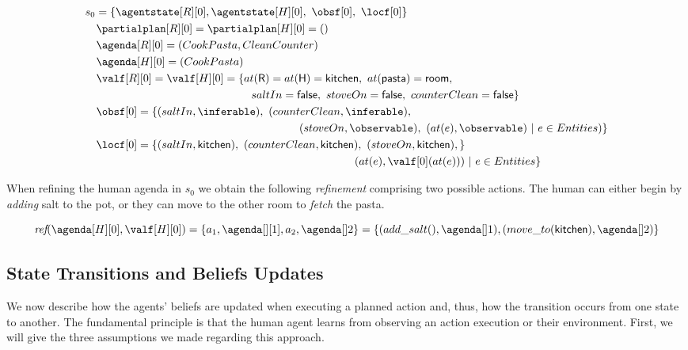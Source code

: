 {\small
\noindent
\begin{align*}
&s_0 = \{\agentstate[R][0], \agentstate[H][0],~\obsf[0],~\locf[0]\} \\
&\quad \partialplan[R][0] = \partialplan[H][0] = ()\\
&\quad \agenda[R][0] = (CookPasta, CleanCounter)\\
&\quad \agenda[H][0] = (CookPasta)\\
&\quad \valf[R][0] = \valf[H][0] = \{at(\textsf{R}) = at(\textsf{H}) = \textsf{kitchen},~at(\textsf{pasta})=\textsf{room},\\
&\qquad \qquad \qquad \qquad \qquad \qquad \qquad \quad saltIn = \textsf{false},~stoveOn = \textsf{false},~counterClean = \textsf{false}\}\\
&\quad \obsf[0] = \{ (saltIn,\inferable),~(counterClean,\inferable),\\
&\qquad \qquad \qquad \qquad \qquad \qquad \qquad \qquad \qquad \quad \ (stoveOn,\observable),~(at(e),\observable) ~|~ e \in Entities)\}\\
&\quad \locf[0] = \{ (saltIn,\textsf{kitchen}),~(counterClean,\textsf{kitchen}),~(stoveOn,\textsf{kitchen}), \}\\
&\qquad \qquad \qquad \qquad \qquad \qquad \qquad \qquad \qquad \qquad \qquad \qquad \ (at(e),\valf[0](at(e))) ~|~ e \in Entities \}
\end{align*}

When refining the human agenda in $s_0$ we obtain the following \textit{refinement} comprising two possible actions. The human can either begin by \textit{adding} salt to the pot, or they can move to the other room to \textit{fetch} the pasta. 

{\small
\begin{equation*}
    \textit{ref}(\agenda[H][0], \valf[H][0]) = \{ a_1,\agenda[][1], a_2,\agenda[]2 \}= \{ (add\_salt(),\agenda[]1), (move\_to(\textsf{kitchen}),\agenda[]2) \}
\end{equation*}
}

    \subsection{State Transitions and Beliefs Updates}

We now describe how the agents' beliefs are updated when executing a planned action and, thus, how the transition occurs from one state to another. The fundamental principle is that the human agent learns from observing an action execution or their environment. First, we will give the three assumptions we made regarding this approach.

}
